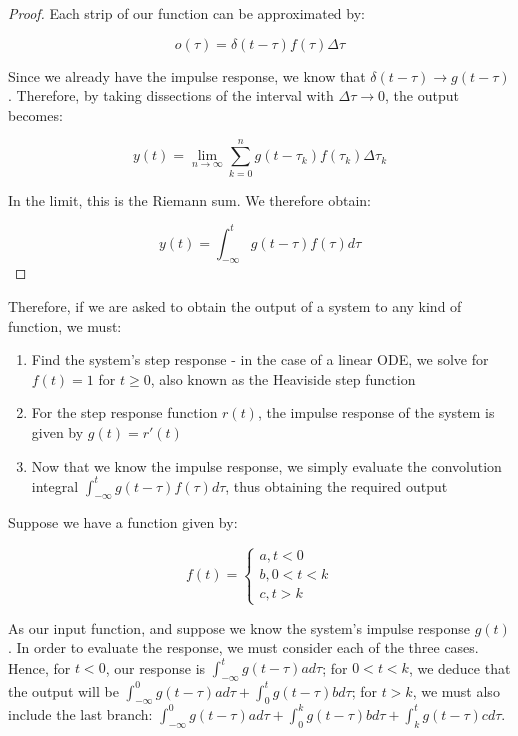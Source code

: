 \documentclass[12pt]{article}
\begin{document}
\begin{proof}
    Each strip of our function can be approximated by:

    \[ o(\tau) = \delta(t - \tau)f(\tau)\Delta \tau \]

    Since we already have the impulse response, we know that $\delta(t - \tau) \to g(t - \tau)$. Therefore, by taking dissections of the interval with $\Delta \tau \to 0$, the output becomes:

    \[ y(t) = \lim_{n \to \infty} \sum_{k = 0}^n g(t - \tau_k)f(\tau_k)\Delta\tau_k \]

    In the limit, this is the Riemann sum. We therefore obtain:

    \[ y(t) = \int_{-\infty}^t g(t - \tau)f(\tau)d\tau \]
\end{proof}

Therefore, if we are asked to obtain the output of a system to any kind of function, we must:

\begin{enumerate}
    \item Find the system's step response - in the case of a linear ODE, we solve for $f(t) = 1$ for $t \geq 0$, also known as the Heaviside step function
    \item For the step response function $r(t)$, the impulse response of the system is given by $g(t) = r'(t)$
    \item Now that we know the impulse response, we simply evaluate the convolution integral $\int_{-\infty}^t g(t - \tau)f(\tau)d\tau$, thus obtaining the required output
\end{enumerate}

\begin{example}
    Suppose we have a function given by:

    \[ f(t) = \begin{cases}
        a, t < 0 \\
        b, 0 < t < k \\
        c, t > k
    \end{cases} \]

    As our input function, and suppose we know the system's impulse response $g(t)$. In order to evaluate the response, we must consider each of the three cases. Hence, for $t < 0$, our response is $\int_{-\infty}^t g(t - \tau)ad\tau$; for $0 < t < k$, we deduce that the output will be $\int_{-\infty}^0 g(t - \tau)ad\tau + \int_{0}^t g(t - \tau)bd\tau$; for $t > k$, we must also include the last branch: $\int_{-\infty}^0 g(t - \tau)ad\tau + \int_{0}^k g(t - \tau)bd\tau + \int_k^t g(t - \tau)cd\tau$.
\end{example}
\end{document}
